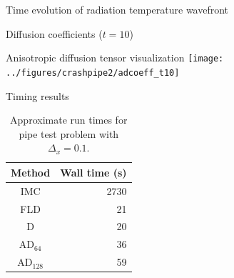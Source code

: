 \documentclass{beamer}
\begin{document}
\begin{frame}{Time evolution of radiation temperature wavefront}
  \centering%
  \par
\end{frame}
\begin{frame}{Diffusion coefficients ($t=10$)}
  \centering%
  \par
\end{frame}
\begin{frame}{Anisotropic diffusion tensor visualization}
  \centering%
  \texttt{[image: ../figures/crashpipe2/adcoeff\_t10]}%
  \par
\end{frame}
\begin{frame}{Timing results}
  \begin{table}[htb]
    \centering
    \begin{tabular}{cr}
      Method & Wall time (s) \\ \hline
      IMC & 2730 \\
      FLD & 21 \\
      D   & 20 \\
      AD$_{64}$ & 36 \\
      AD$_{128}$ & 59
    \end{tabular}
    \caption{Approximate run times for pipe test problem with $\Delta_x=0.1$.}
    \label{tab:pipeTiming}
  \end{table}
\end{frame}

\end{document}
